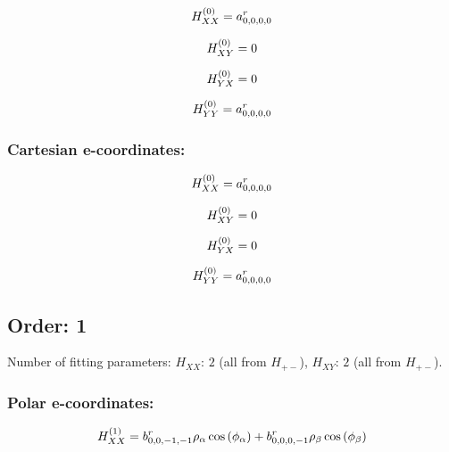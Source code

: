 \documentclass[fleqn]{article}
\begin{document}
\begin{dmath*}
H_{XX}^{(0)}=a^{r}_{0,0,0,0}\\
\end{dmath*}

\begin{dmath*}
H_{XY}^{(0)}=0\\
\end{dmath*}

\begin{dmath*}
H_{YX}^{(0)}=0\\
\end{dmath*}

\begin{dmath*}
H_{YY}^{(0)}= a^{r}_{0,0,0,0}\\
\end{dmath*}
\subsubsection*{Cartesian e-coordinates:}

\begin{dmath*}
H_{XX}^{(0)}=a^{r}_{0,0,0,0}\\
\end{dmath*}

\begin{dmath*}
H_{XY}^{(0)}=0\\
\end{dmath*}

\begin{dmath*}
H_{YX}^{(0)}=0\\
\end{dmath*}

\begin{dmath*}
H_{YY}^{(0)}= a^{r}_{0,0,0,0}\\
\end{dmath*}
\subsection{Order: 1}
Number of fitting parameters: $H_{XX}$: $2$ (all from $H_{+-}$), $H_{XY}$: $2$ (all from $H_{+-}$).
\subsubsection*{Polar e-coordinates:}

\begin{dmath*}
H_{XX}^{(1)}=b^{r}_{0,0,-1,-1} \rho_{\alpha} \cos{\left (\phi_{\alpha} \right )} + b^{r}_{0,0,0,-1} \rho_{\beta} \cos{\left (\phi_{\beta} \right )}\\
\end{dmath*}
\end{document}
